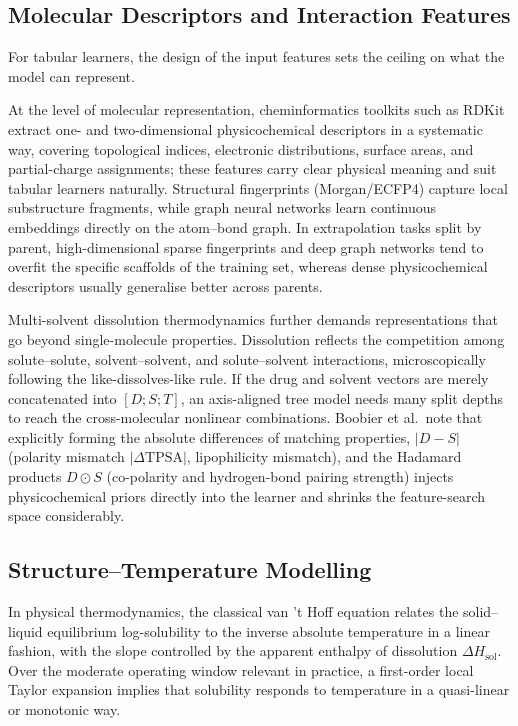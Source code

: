 \subsection{Molecular Descriptors and Interaction Features}

For tabular learners, the design of the input features sets the ceiling on what the model can represent.

At the level of molecular representation, cheminformatics toolkits such as RDKit extract one- and two-dimensional physicochemical descriptors in a systematic way, covering topological indices, electronic distributions, surface areas, and partial-charge assignments; these features carry clear physical meaning and suit tabular learners naturally. Structural fingerprints (Morgan/ECFP4) capture local substructure fragments\cite{ye2021}, while graph neural networks learn continuous embeddings directly on the atom--bond graph\cite{fastsolv2025}. In extrapolation tasks split by parent, high-dimensional sparse fingerprints and deep graph networks tend to overfit the specific scaffolds of the training set, whereas dense physicochemical descriptors usually generalise better across parents.

Multi-solvent dissolution thermodynamics further demands representations that go beyond single-molecule properties. Dissolution reflects the competition among solute--solute, solvent--solvent, and solute--solvent interactions, microscopically following the like-dissolves-like rule. If the drug and solvent vectors are merely concatenated into $[D; S; T]$, an axis-aligned tree model needs many split depths to reach the cross-molecular nonlinear combinations. Boobier et al.\ note that explicitly forming the absolute differences of matching properties, $|D-S|$ (polarity mismatch $|\Delta\mathrm{TPSA}|$, lipophilicity mismatch), and the Hadamard products $D\odot S$ (co-polarity and hydrogen-bond pairing strength) injects physicochemical priors directly into the learner and shrinks the feature-search space considerably\cite{boobier2020}.

\subsection{Structure--Temperature Modelling}

In physical thermodynamics, the classical van 't Hoff equation relates the solid--liquid equilibrium log-solubility to the inverse absolute temperature in a linear fashion, with the slope controlled by the apparent enthalpy of dissolution $\Delta H_{\mathrm{sol}}$. Over the moderate operating window relevant in practice, a first-order local Taylor expansion implies that solubility responds to temperature in a quasi-linear or monotonic way.

